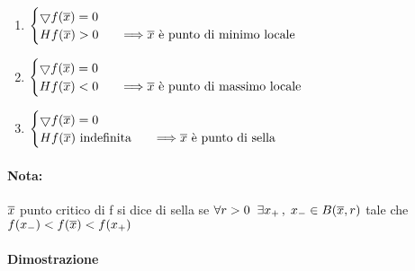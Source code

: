 \documentclass[12pt]{article}
\begin{document}
\begin{enumerate}
    \item $
              \begin{cases}
                  \bigtriangledown f(\overline{x}) = 0                                             \\
                  Hf(\overline{x}) > 0 & \quad\Longrightarrow \overline{x} \text{ è punto di minimo locale}
              \end{cases}
          $
    \item $
              \begin{cases}
                  \bigtriangledown f(\overline{x}) = 0                                              \\
                  Hf(\overline{x}) < 0 & \quad\Longrightarrow \overline{x} \text{ è punto di massimo locale}
              \end{cases}
          $
    \item $
              \begin{cases}
                  \bigtriangledown f(\overline{x}) = 0                                                    \\
                  Hf(\overline{x}) \text{ indefinita} & \quad\Longrightarrow \overline{x} \text{ è punto di sella}
              \end{cases}
          $
\end{enumerate}

\paragraph*{Nota:}
$\overline{x}$ punto critico di f si dice di sella se $\forall r > 0\;\; \exists x_+\,,\; x_- \in B(\overline{x}, r)$
tale che $f(x_-) < f(\overline{x}) < f(x_+)$

\paragraph*{Dimostrazione}
\end{document}

